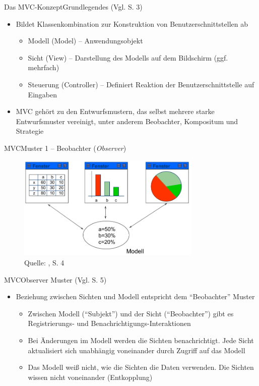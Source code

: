 \begin{frame}{Das MVC-Konzept}{Grundlegendes (Vgl. \cite{judt2017} S. 3)}
    \begin{itemize}
        \item Bildet Klassenkombination zur Konstruktion von Benutzerschnittstellen ab
        \begin{itemize}
            \item Modell (Model) -- Anwendungsobjekt
            \item Sicht (View) -- Darstellung des Modells auf dem Bildschirm (ggf. mehrfach)
            \item Steuerung (Controller) -- Definiert Reaktion der Benutzerschnittstelle auf Eingaben
        \end{itemize}
        \item MVC gehört zu den Entwurfsmustern, das selbst mehrere starke Entwurfsmuster vereinigt, unter anderem Beobachter, Kompositum und Strategie
    \end{itemize}
\end{frame}

\begin{frame}{MVC}{Muster 1 -- Beobachter (\textit{Observer})}
    \begin{figure}
    \centering
    \includegraphics[height=5cm]{graph/mvc_observer}
    \caption*{Quelle: \cite{judt2017}, S. 4}
    \end{figure}
\end{frame}

\begin{frame}{MVC}{Observer Muster (Vgl. \cite{judt2017} S. 5)}
    \begin{itemize}
        \item Beziehung zwischen Sichten und Modell entspricht dem "`Beobachter"' Muster
        \begin{itemize}
            \item Zwischen Modell ("`Subjekt"') und der Sicht ("`Beobachter"') gibt es Registrierungs- und Benachrichtigungs-Interaktionen
            \item Bei Änderungen im Modell werden die Sichten benachrichtigt. Jede Sicht aktualisiert sich unabhängig voneinander durch Zugriff auf das Modell
            \item Das Modell weiß nicht, wie die Sichten die Daten verwenden. Die Sichten wissen nicht voneinander (Entkopplung)
        \end{itemize}
    \end{itemize}
\end{frame}

